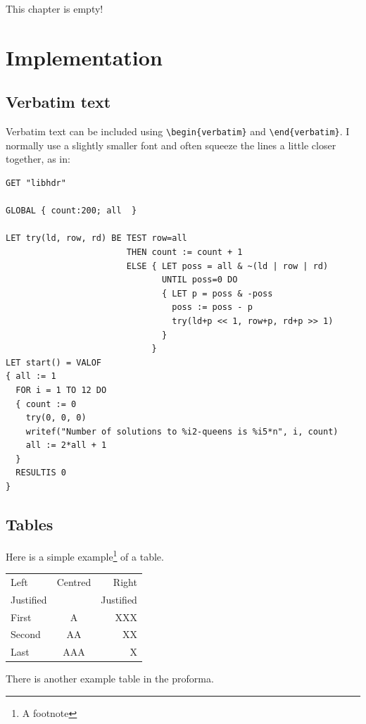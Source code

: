 \documentclass[12pt,a4paper,twoside,openright]{report}
\renewcommand{\baselinestretch}{1.1}    %
\begin{document}
This chapter is empty!


\chapter{Implementation}

\section{Verbatim text}

Verbatim text can be included using \verb|\begin{verbatim}| and
\verb|\end{verbatim}|. I normally use a slightly smaller font and
often squeeze the lines a little closer together, as in:

{\renewcommand{\baselinestretch}{0.8}\small
\begin{verbatim}
GET "libhdr"
 
GLOBAL { count:200; all  }
 
LET try(ld, row, rd) BE TEST row=all
                        THEN count := count + 1
                        ELSE { LET poss = all & ~(ld | row | rd)
                               UNTIL poss=0 DO
                               { LET p = poss & -poss
                                 poss := poss - p
                                 try(ld+p << 1, row+p, rd+p >> 1)
                               }
                             }
LET start() = VALOF
{ all := 1
  FOR i = 1 TO 12 DO
  { count := 0
    try(0, 0, 0)
    writef("Number of solutions to %i2-queens is %i5*n", i, count)
    all := 2*all + 1
  }
  RESULTIS 0
}
\end{verbatim}
}

\section{Tables}

\begin{samepage}
Here is a simple example\footnote{A footnote} of a table.

\begin{center}
\begin{tabular}{l|c|r}
Left      & Centred & Right \\
Justified &         & Justified \\[3mm]
First     & A       & XXX \\
Second    & AA      & XX  \\
Last      & AAA     & X   \\
\end{tabular}
\end{center}

\noindent
There is another example table in the proforma.
\end{samepage}
\end{document}
